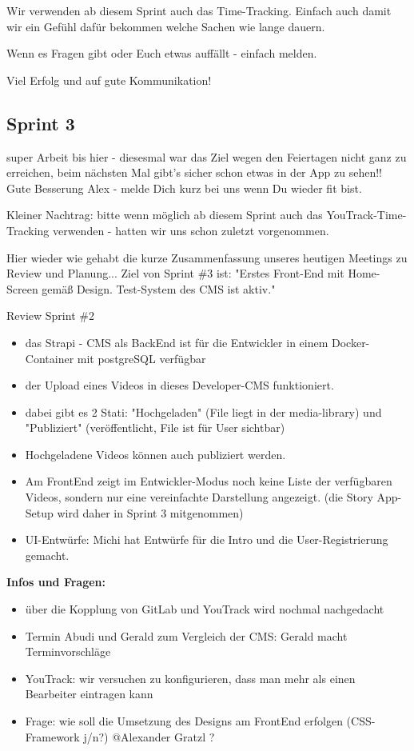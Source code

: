 Wir verwenden ab diesem Sprint auch das Time-Tracking.
Einfach auch damit wir ein Gefühl dafür bekommen welche Sachen wie lange dauern.

Wenn es Fragen gibt oder Euch etwas auffällt - einfach melden.

Viel Erfolg und auf gute Kommunikation!

\subsection*{Sprint 3}

super Arbeit bis hier - diesesmal war das Ziel wegen den Feiertagen nicht ganz zu erreichen, beim nächsten Mal gibt's sicher schon etwas in der App zu sehen!!
Gute Besserung Alex - melde Dich kurz bei uns wenn Du wieder fit bist.

Kleiner Nachtrag: bitte wenn möglich ab diesem Sprint auch das YouTrack-Time-Tracking verwenden - hatten wir uns schon zuletzt vorgenommen.

Hier wieder wie gehabt die kurze Zusammenfassung unseres heutigen Meetings zu Review und Planung...
Ziel von Sprint \#3 ist: "Erstes Front-End mit Home-Screen gemäß Design. Test-System des CMS ist aktiv."

Review Sprint \#2

\begin{itemize}
    \item das Strapi - CMS als BackEnd ist für die Entwickler in einem Docker-Container mit postgreSQL verfügbar
    \item der Upload eines Videos in dieses Developer-CMS funktioniert.
    \item dabei gibt es 2 Stati: "Hochgeladen" (File liegt in der media-library) und "Publiziert" (veröffentlicht, File ist für User sichtbar)
    \item Hochgeladene Videos können auch publiziert werden.
    \item Am FrontEnd zeigt im Entwickler-Modus noch keine Liste der verfügbaren Videos, sondern nur eine vereinfachte Darstellung angezeigt. (die Story App-Setup wird daher in Sprint 3 mitgenommen)
    \item UI-Entwürfe: Michi hat Entwürfe für die Intro und die User-Registrierung gemacht.

\end{itemize}


\textbf{Infos und Fragen:}

\begin{itemize}
    \item über die Kopplung von GitLab und YouTrack wird nochmal nachgedacht
    \item Termin Abudi und Gerald zum Vergleich der CMS: Gerald macht Terminvorschläge
    \item YouTrack: wir versuchen zu konfigurieren, dass man mehr als einen Bearbeiter eintragen kann
    \item Frage: wie soll die Umsetzung des Designs am FrontEnd erfolgen (CSS-Framework j/n?) @Alexander Gratzl ?



\end{itemize}

